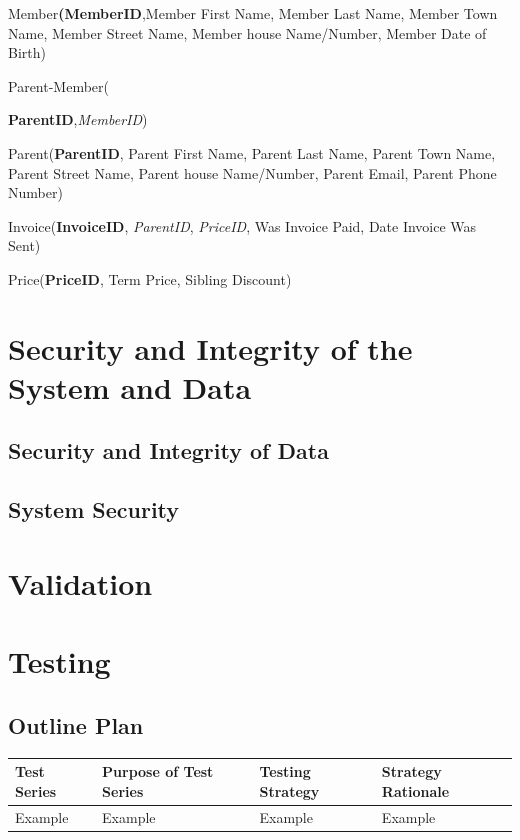 Member\textbf{(MemberID},Member First Name, Member Last Name, Member Town Name, Member Street Name, Member house Name/Number, Member Date of Birth)

Parent-Member({\textbf{ParentID},\textit{MemberID})

Parent(\textbf{ParentID}, Parent First Name, Parent Last Name, Parent Town Name, Parent Street Name, Parent house Name/Number,  Parent Email, Parent Phone Number)

Invoice(\textbf{InvoiceID}, \textit{ParentID}, \textit{PriceID}, Was Invoice Paid, Date Invoice Was Sent)

Price(\textbf{PriceID}, Term Price, Sibling Discount)

\section{Security and Integrity of the System and Data}

\subsection{Security and Integrity of Data}

\subsection{System Security}

\section{Validation}

\section{Testing}

\begin{landscape}
\subsection{Outline Plan}

\begin{center}
    \begin{tabular}{|p{2cm}|p{5cm}|p{5cm}|p{4cm}|}
        \hline
        \textbf{Test Series} & \textbf{Purpose of Test Series} & \textbf{Testing Strategy} & \textbf{Strategy Rationale}\\ \hline
        Example & Example & Example & Example \\ \hline
    \end{tabular}
\end{center}


\end{landscape}}
